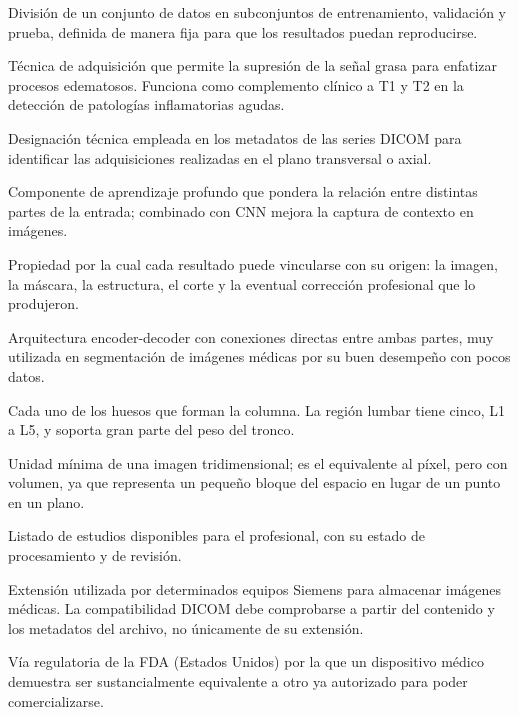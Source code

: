 \begin{description}[leftmargin=3.8cm, style=nextline, itemsep=3pt, topsep=3pt]
    \item[Split] División de un conjunto de datos en subconjuntos de entrenamiento, validación y prueba, definida de manera fija para que los resultados puedan reproducirse.

    \item[STIR (Short Tau Inversion Recovery)] Técnica de adquisición que permite la supresión de la señal grasa para enfatizar procesos edematosos. Funciona como complemento clínico a T1 y T2 en la detección de patologías inflamatorias agudas.

    \item[TRA (transverse)] Designación técnica empleada en los metadatos de las series DICOM para identificar las adquisiciones realizadas en el plano transversal o axial.

    \item[Transformer / mecanismo de atención] Componente de aprendizaje profundo que pondera la relación entre distintas partes de la entrada; combinado con CNN mejora la captura de contexto en imágenes.

    \item[Trazabilidad] Propiedad por la cual cada resultado puede vincularse con su origen: la imagen, la máscara, la estructura, el corte y la eventual corrección profesional que lo produjeron.

    \item[U-Net] Arquitectura encoder-decoder con conexiones directas entre ambas partes, muy utilizada en segmentación de imágenes médicas por su buen desempeño con pocos datos.

    \item[Vértebra] Cada uno de los huesos que forman la columna. La región lumbar tiene cinco, L1 a L5, y soporta gran parte del peso del tronco.

    \item[Vóxel] Unidad mínima de una imagen tridimensional; es el equivalente al píxel, pero con volumen, ya que representa un pequeño bloque del espacio en lugar de un punto en un plano.

    \item[Worklist] Listado de estudios disponibles para el profesional, con su estado de procesamiento y de revisión.

    \item[Archivo .ima] Extensión utilizada por determinados equipos Siemens para almacenar imágenes médicas. La compatibilidad DICOM debe comprobarse a partir del contenido y los metadatos del archivo, no únicamente de su extensión.

    \item[510(k)] Vía regulatoria de la FDA (Estados Unidos) por la que un dispositivo médico demuestra ser sustancialmente equivalente a otro ya autorizado para poder comercializarse.

\end{description}

